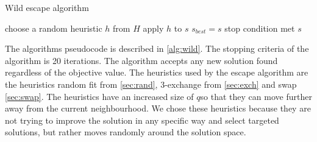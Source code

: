 \documentclass[../main.tex]{subfiles}
\begin{document}
\begin{algorithm}
    \label{alg:wild}
    \caption{Wild escape algorithm}
    \begin{algorithmic}[1]
        \Repeat
            \State choose a random heuristic $h$ from $H$
            \State apply $h$ to $s$
                \State $s_{best} = s$
            \EndIf
        \Until stop condition met
        \State \Return $s$
        \EndFunction
    \end{algorithmic}
\end{algorithm}

The algorithms pseudocode is described in \cref{alg:wild}. The stopping criteria of the algorithm is 20 iterations. 
The algorithm accepts any new solution found regardless of the objective value.
The heuristics used by the escape algorithm are the heuristics random fit from \cref{sec:rand}, 3-exchange from \cref{sec:exch} and swap \cref{sec:swap}. The heuristics have an increased size of $q$so that they can move further away from the current neighbourhood. We chose these heuristics because they are not trying to improve the solution in any specific way and select targeted solutions, but rather moves randomly around the solution space. 
\biblio                                                         
\end{document}
